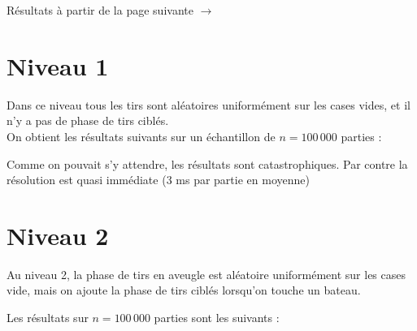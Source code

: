 \vfill 
\begin{flushright}
Résultats à partir de la page suivante $\rightarrow$
\end{flushright}
\newpage
\section{Niveau 1}
Dans ce niveau tous les tirs sont aléatoires uniformément sur les cases vides, et il n'y a pas de phase de tirs ciblés.\\
On obtient les résultats suivants sur un échantillon de $n=100\,000$ parties :

\begin{center}\label{histo_algo}
\end{center}

Comme on pouvait s'y attendre, les résultats sont catastrophiques. Par contre la résolution est quasi immédiate (3 ms par partie en moyenne)
\newpage
\section{Niveau 2}
Au niveau 2, la phase de tirs en aveugle est aléatoire uniformément sur les cases vide, mais on ajoute la phase de tirs ciblés lorsqu'on touche un bateau.

Les résultats sur $n=100\,000$ parties sont les suivants :


